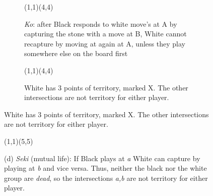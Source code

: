 \documentclass[../math194_paper.tex]{subfiles}
\begin{document}
\begin{figure}[H]
\begin{subfigure}[b]{0.45\linewidth}
\centering
\begin{psgopartialboard*}{(1,1)(4,4)}
\end{psgopartialboard*}
\caption{
    \textit{Ko}: after Black responds to white move's at A by capturing the stone with a move at B, 
    White cannot recapture by moving at again at A, unless they play somewhere else on the board first
}
\end{subfigure}
\quad
\begin{subfigure}[b]{0.45\linewidth}
\centering
\begin{psgopartialboard*}{(1,1)(4,4)}
    
\end{psgopartialboard*}
\caption{
    White has 3 points of territory, marked X. The other intersections are not territory for either player.
}
\end{subfigure}
\end{figure}

\begin{figure}[H]
\centering
\begin{psgopartialboard*}{(1,1)(5,5)}
    
    
    
\end{psgopartialboard*}
\caption*{
    (d) \textit{Seki} (mutual life): If Black plays at \textit{a} White can capture by playing at \textit{b} 
    and vice versa. Thus, neither the black nor the white group are \textit{dead}, so the intersections 
    \textit{a,b} are not territory for either player. 
}
\end{figure}
\end{document}
